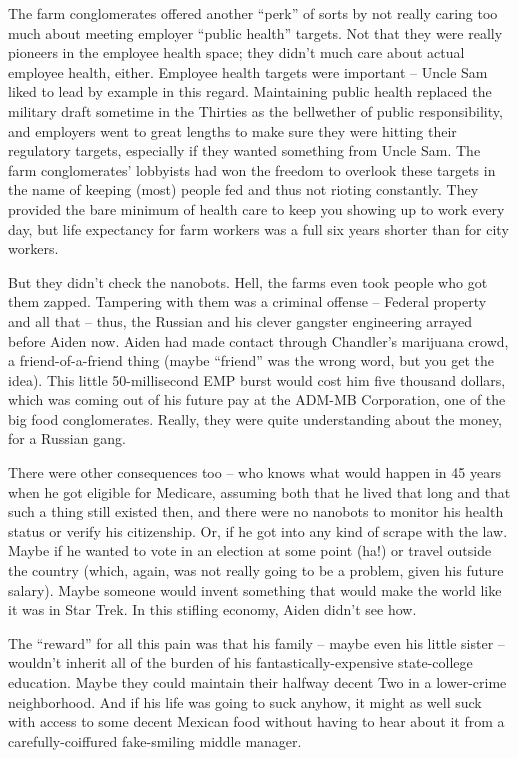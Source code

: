 \documentclass[11pt]{book}
\begin{document}
	The farm conglomerates offered another ``perk'' of sorts by not really caring too much about meeting employer ``public health'' targets. Not that they were really pioneers in the employee health space; they didn't much care about actual employee health, either. Employee health targets were important -- Uncle Sam liked to lead by example in this regard. Maintaining public health replaced the military draft sometime in the Thirties as the bellwether of public responsibility, and employers went to great lengths to make sure they were hitting their regulatory targets, especially if they wanted something from Uncle Sam. The farm conglomerates' lobbyists had won the freedom to overlook these targets in the name of keeping (most) people fed and thus not rioting constantly. They provided the bare minimum of health care to keep you showing up to work every day, but life expectancy for farm workers was a full six years shorter than for city workers. 
	
	But they didn't check the nanobots. Hell, the farms even took people who got them zapped. Tampering with them was a criminal offense -- Federal property and all that -- thus, the Russian and his clever gangster engineering arrayed before Aiden now. Aiden had made contact through Chandler's marijuana crowd, a friend-of-a-friend thing (maybe ``friend'' was the wrong word, but you get the idea). This little 50-millisecond EMP burst would cost him five thousand dollars, which was coming out of his future pay at the ADM-MB Corporation, one of the big food conglomerates. Really, they were quite understanding about the money, for a Russian gang. 
	
	There were other consequences too -- who knows what would happen in 45 years when he got eligible for Medicare, assuming both that he lived that long and that such a thing still existed then, and there were no nanobots to monitor his health status or verify his citizenship. Or, if he got into any kind of scrape with the law. Maybe if he wanted to vote in an election at some point (ha!) or travel outside the country (which, again, was not really going to be a problem, given his future salary). Maybe someone would invent something that would make the world like it was in Star Trek. In this stifling economy, Aiden didn't see how. 
	
	The ``reward'' for all this pain was that his family -- maybe even his little sister -- wouldn't inherit all of the burden of his fantastically-expensive state-college education. Maybe they could maintain their halfway decent Two in a lower-crime neighborhood. And if his life was going to suck anyhow, it might as well suck with access to some decent Mexican food without having to hear about it from a carefully-coiffured fake-smiling middle manager.
	
\end{document}
